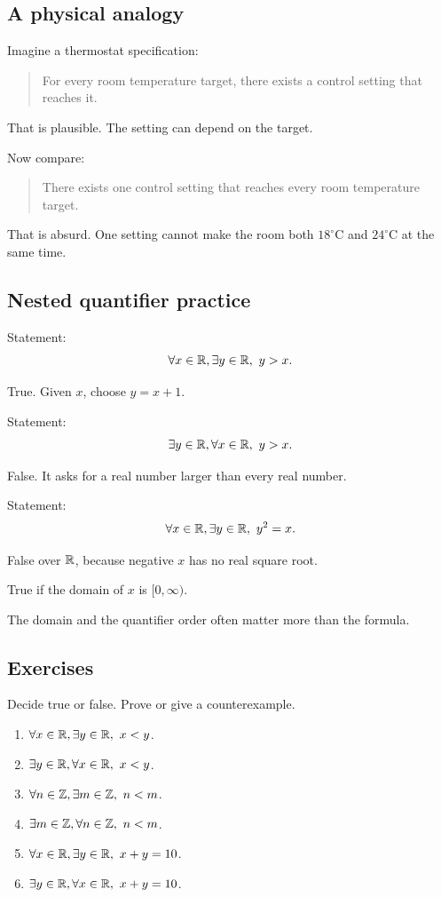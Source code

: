\documentclass[12pt]{article}
\begin{document}
\subsection{A physical analogy}

Imagine a thermostat specification:

\begin{quote}
For every room temperature target, there exists a control setting that reaches it.
\end{quote}

That is plausible. The setting can depend on the target.

Now compare:

\begin{quote}
There exists one control setting that reaches every room temperature target.
\end{quote}

That is absurd. One setting cannot make the room both $18^\circ$C and $24^\circ$C at the same time.

\subsection{Nested quantifier practice}

Statement:
\[
\forall x\in\mathbb{R},\exists y\in\mathbb{R},\ y>x.
\]

True. Given $x$, choose $y=x+1$.

Statement:
\[
\exists y\in\mathbb{R},\forall x\in\mathbb{R},\ y>x.
\]

False. It asks for a real number larger than every real number.

Statement:
\[
\forall x\in\mathbb{R},\exists y\in\mathbb{R},\ y^2=x.
\]

False over $\mathbb{R}$, because negative $x$ has no real square root.

True if the domain of $x$ is $[0,\infty)$.

\begin{focusbox}
The domain and the quantifier order often matter more than the formula.
\end{focusbox}

\subsection{Exercises}

Decide true or false. Prove or give a counterexample.

\begin{enumerate}
\item $\forall x\in\R,\exists y\in\R,\ x<y$.
\item $\exists y\in\R,\forall x\in\R,\ x<y$.
\item $\forall n\in\Z,\exists m\in\Z,\ n<m$.
\item $\exists m\in\Z,\forall n\in\Z,\ n<m$.
\item $\forall x\in\R,\exists y\in\R,\ x+y=10$.
\item $\exists y\in\R,\forall x\in\R,\ x+y=10$.
\end{enumerate}
\end{document}
